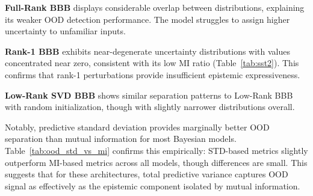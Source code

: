 \documentclass{article}
\theoremstyle{plain}
\theoremstyle{definition}
\theoremstyle{remark}
\begin{document}
\textbf{Full-Rank BBB} displays considerable overlap between distributions, explaining its weaker OOD detection performance. The model struggles to assign higher uncertainty to unfamiliar inputs.

\textbf{Rank-1 BBB} exhibits near-degenerate uncertainty distributions with values concentrated near zero, consistent with its low MI ratio (Table~\ref{tab:sst2}). This confirms that rank-1 perturbations provide insufficient epistemic expressiveness.

\textbf{Low-Rank SVD BBB} shows similar separation patterns to Low-Rank BBB with random initialization, though with slightly narrower distributions overall.

Notably, predictive standard deviation provides marginally better OOD separation than mutual information for most Bayesian models. Table~\ref{tab:ood_std_vs_mi} confirms this empirically: STD-based metrics slightly outperform MI-based metrics across all models, though differences are small. This suggests that for these architectures, total predictive variance captures OOD signal as effectively as the epistemic component isolated by mutual information.

\begin{table}[!ht]
\centering
\caption{OOD detection metrics using Mutual Information (MI) vs Predictive Standard Deviation (STD) as uncertainty measures. Results averaged over 4 seeds. Higher is better for all metrics.}
\label{tab:ood_std_vs_mi}
\end{table}
\end{document}
